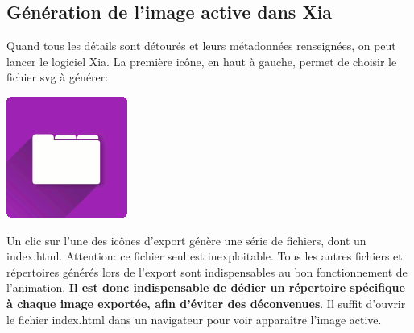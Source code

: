 \documentclass[a4paper,12pt]{report}
\begin{document}
\subsection{Génération de l'image active dans Xia}

Quand tous les détails sont détourés et leurs métadonnées renseignées, on peut lancer le logiciel Xia.
La première icône, en haut à gauche, permet de choisir le fichier svg à générer:
\begin{center}
\includegraphics[scale=0.4]{./images/xia_open} 
\end{center}

Un clic sur l'une des icônes d'export génère une série de fichiers, dont un index.html. 
Attention: ce fichier seul est inexploitable. Tous les autres fichiers et répertoires générés lors de l'export 
sont indispensables au bon fonctionnement de l'animation. \textbf{Il est donc indispensable de dédier un répertoire 
spécifique à chaque image exportée, afin d'éviter des déconvenues}.
Il suffit d'ouvrir le fichier index.html dans un navigateur pour voir apparaître l'image active.
\end{document}
